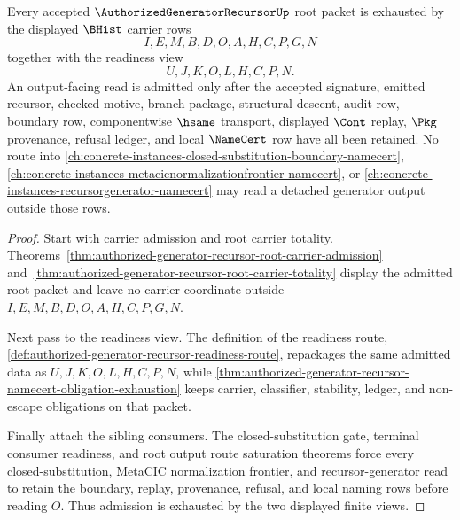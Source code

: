 \begin{theorem}
\label{thm:authorized-generator-recursor-admission-exhaustion}
Every accepted $\AuthorizedGeneratorRecursorUp$ root packet is exhausted by the displayed $\BHist$ carrier rows
$$
I,E,M,B,D,O,A,H,C,P,G,N
$$
together with the readiness view
$$
U,J,K,O,L,H,C,P,N.
$$
An output-facing read is admitted only after the accepted signature, emitted recursor, checked motive, branch package, structural descent, audit row, boundary row, componentwise $\hsame$ transport, displayed $\Cont$ replay, $\Pkg$ provenance, refusal ledger, and local $\NameCert$ row have all been retained. No route into \autoref{ch:concrete-instances-closed-substitution-boundary-namecert}, \autoref{ch:concrete-instances-metacicnormalizationfrontier-namecert}, or \autoref{ch:concrete-instances-recursorgenerator-namecert} may read a detached generator output outside those rows.
\end{theorem}
\begin{proof}
Start with carrier admission and root carrier totality. Theorems~\ref{thm:authorized-generator-recursor-root-carrier-admission} and~\ref{thm:authorized-generator-recursor-root-carrier-totality} display the admitted root packet and leave no carrier coordinate outside $I,E,M,B,D,O,A,H,C,P,G,N$.

Next pass to the readiness view. The definition of the readiness route, \autoref{def:authorized-generator-recursor-readiness-route}, repackages the same admitted data as $U,J,K,O,L,H,C,P,N$, while \autoref{thm:authorized-generator-recursor-namecert-obligation-exhaustion} keeps carrier, classifier, stability, ledger, and non-escape obligations on that packet.

Finally attach the sibling consumers. The closed-substitution gate, terminal consumer readiness, and root output route saturation theorems force every closed-substitution, MetaCIC normalization frontier, and recursor-generator read to retain the boundary, replay, provenance, refusal, and local naming rows before reading $O$. Thus admission is exhausted by the two displayed finite views.
\end{proof}

